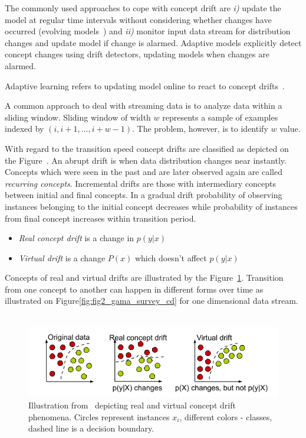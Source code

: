 The commonly used approaches to cope with concept drift are \textit{i)} update the model at regular time intervals without considering whether changes have occurred (evolving models~\cite{SouzaChallenges2020}) and \textit{ii)} monitor input data stream for distribution changes and update model if change is alarmed. 
Adaptive models explicitly detect concept changes using drift detectors, updating models when changes are alarmed.  

Adaptive learning refers to updating model online to react to concept drifts~\cite{gama2014survey}.

A common approach to deal with streaming data is to analyze data within a sliding window. 
Sliding window of width $w$ represents a sample of examples indexed by $(i, i+1, \dots, i+w-1)$. 
The problem, however, is to identify $w$ value.

With regard to the transition speed concept drifts are classified as depicted on the Figure~\cite{fig:souza_cd_speeds}.
An abrupt drift is when data distribution changes near instantly.
Concepts which were seen in the past and are later observed again are called \textit{recurring concepts}.
Incremental drifts are those with intermediary concepts between initial and final concepts.
In a gradual drift probability of observing instances belonging to the initial concept decreases while probability of instances from final concept increases within transition period.

\begin{itemize}
  \item \textit{Real concept drift}\cite{gama2014survey,gao2007general, salganicoff1997tolerating} is a change in $p(y|x)$
  \item \textit{Virtual drift}\cite{delany2004case,tsymbal2004problem,widmer1993effective} is a change $P(x)$ which doesn't affect $p(y|x)$
\end{itemize}

Concepts of real and virtual drifts are illustrated by the Figure~\ref{fig:fig1_gama_survey_cd}.
Transition from one concept to another can happen in different forms over time as illustrated on Figure\ref{fig:fig2_gama_survey_cd} for one dimensional data stream.  
~\cite{karkkainen2014region}

\begin{figure}[htb!]
	\centering
	\includegraphics[height=0.15\textheight]{images_cropped/gama_survey_cd_fig1}
	\caption{Illustration from~\cite{gama2014survey} depicting real and virtual concept drift phenomena. Circles represent instances $x_i$, different colors - classes, dashed line is a decision boundary. }\label{fig:fig1_gama_survey_cd}
\end{figure}

